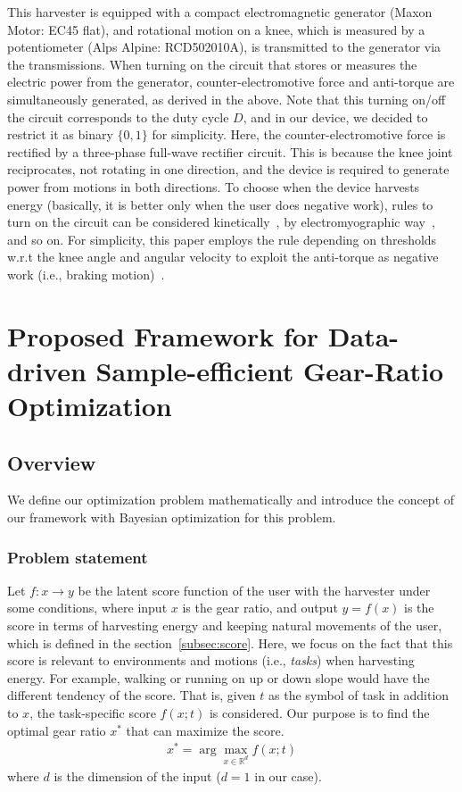 \documentclass[twocolumn]{svjour3}          %
\begin{document}
This harvester is equipped with a compact electromagnetic generator (Maxon Motor: EC45 flat), and rotational motion on a knee, which is measured by a potentiometer (Alps Alpine: RCD502010A), is transmitted to the generator via the transmissions.
When turning on the circuit that stores or measures the electric power from the generator, counter-electromotive force and anti-torque are simultaneously generated, as derived in the above.
Note that this turning on/off the circuit corresponds to the duty cycle $D$, and in our device, we decided to restrict it as binary $\{0,1\}$ for simplicity.
Here, the counter-electromotive force is rectified by a three-phase full-wave rectifier circuit.
This is because the knee joint reciprocates, not rotating in one direction, and the device is required to generate power from motions in both directions.
To choose when the device harvests energy (basically, it is better only when the user does negative work), rules to turn on the circuit can be considered kinetically~\cite{donelan2008biomechanical}, by electromyographic way~\cite{selinger2015myoelectric}, and so on.
For simplicity, this paper employs the rule depending on thresholds w.r.t the knee angle and angular velocity to exploit the anti-torque as negative work (i.e., braking motion)~\cite{ikawa2018biomechanical}.
%
\section{Proposed Framework for Data-driven Sample-efficient Gear-Ratio Optimization}
\label{sec:optimization}

\subsection{Overview}

We define our optimization problem mathematically and introduce the concept of our framework with Bayesian optimization for this problem.

\subsubsection{Problem statement}

Let $f: x \to y$ be the latent score function of the user with the harvester under some conditions, where input $x$ is the gear ratio, and output $y = f(x)$ is the score in terms of harvesting energy and keeping natural movements of the user, which is defined in the section~\ref{subsec:score}.
Here, we focus on the fact that this score is relevant to environments and motions (i.e., \textit{tasks}) when harvesting energy.
For example, walking or running on up or down slope would have the different tendency of the score.
That is, given $t$ as the symbol of task in addition to $x$, the task-specific score $f(x; t)$ is considered.
Our purpose is to find the optimal gear ratio $x^*$ that can maximize the score.
\begin{align}
x^* = \arg \max_{x \in \mathbb{R}^d} f(x; t)
\label{eq:opt_problem}
\end{align}
where $d$ is the dimension of the input ($d=1$ in our case).
\end{document}
